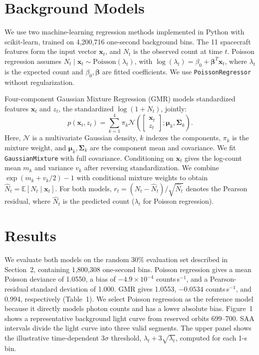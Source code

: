 \documentclass[11pt,twoside]{article}
\begin{document}
\section{Background Models}

We use two machine-learning regression methods implemented in Python with scikit-learn, trained on 4,200,716 one-second background bins. The 11 spacecraft features form the input vector $\mathbf{x}_t$, and $N_t$ is the observed count at time $t$. Poisson regression \citep{McCullagh1989} assumes $N_t\mid\mathbf{x}_t\sim\mathrm{Poisson}(\lambda_t)$, with $\log(\lambda_t)=\beta_0+\boldsymbol{\beta}^{T}\mathbf{x}_t$, where $\lambda_t$ is the expected count and $\beta_0,\boldsymbol{\beta}$ are fitted coefficients. We use \texttt{PoissonRegressor} without regularization.


Four-component Gaussian Mixture Regression (GMR) \citep{Ghahramani1994} models standardized features $\mathbf{x}_t$ and $z_t$, the standardized $\log(1+N_t)$, jointly:
\[
p(\mathbf{x}_t,z_t)=\sum_{k=1}^{4}\pi_k\mathcal{N}\!\left(\begin{bmatrix}\mathbf{x}_t\\z_t\end{bmatrix};\boldsymbol{\mu}_k,\boldsymbol{\Sigma}_k\right).
\]
Here, $\mathcal{N}$ is a multivariate Gaussian density, $k$ indexes the components, $\pi_k$ is the mixture weight, and $\boldsymbol{\mu}_k,\boldsymbol{\Sigma}_k$ are the component mean and covariance. We fit \texttt{GaussianMixture} with full covariance. Conditioning on $\mathbf{x}_t$ gives the log-count mean $m_k$ and variance $v_k$ after reversing standardization. We combine $\exp(m_k+v_k/2)-1$ with conditional mixture weights to obtain $\hat{N}_t=\mathbb{E}[N_t\mid\mathbf{x}_t]$. For both models, $r_t=(N_t-\hat{N}_t)/\sqrt{\hat{N}_t}$ denotes the Pearson residual, where $\hat{N}_t$ is the predicted count ($\lambda_t$ for Poisson regression). 


\section{Results}


We evaluate both models on the random 30\% evaluation set described in Section~2, containing 1,800,308 one-second bins. Poisson regression gives a mean Poisson deviance of 1.0550, a bias of $-4.9\times10^{-4}$ counts\,s$^{-1}$, and a Pearson-residual standard deviation of 1.000. GMR gives 1.0553, $-0.0534$ counts\,s$^{-1}$, and 0.994, respectively (Table~1). We select Poisson regression as the reference model because it directly models photon counts and has a lower absolute bias. Figure~1 shows a representative background light curve from reserved orbits 699--700. SAA intervals divide the light curve into three valid segments. The upper panel shows the illustrative time-dependent $3\sigma$ threshold, $\lambda_t+3\sqrt{\lambda_t}$, computed for each 1-s bin.
\end{document}
